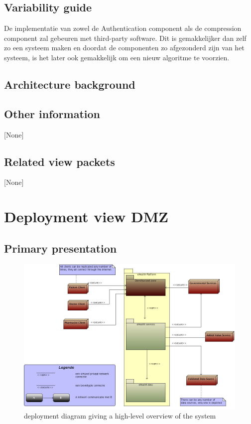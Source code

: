 \documentclass[a4paper,10pt]{article}
\begin{document}
\subsection{Variability guide}
De implementatie van zowel de Authentication component als de compression component zal gebeuren met third-party software. Dit is gemakkelijker dan zelf zo een systeem maken en doordat de componenten zo afgezonderd zijn van het systeem, is het later ook gemakkelijk om een nieuw algoritme te voorzien.\\

\subsection{Architecture background}



\subsection{Other information}
[None]

\subsection{Related view packets}
[None]

\clearpage
\section{Deployment view DMZ}
\label{sec:deploymentView:DMZ}

\subsection{Primary presentation}
 \begin{center}
    \begin{figure}[!h]
      \includegraphics[width=\textwidth]{../images/deployment_DMZ.jpg}
	\caption{deployment diagram giving a high-level overview of the system}
    \end{figure}
 \end{center}
\end{document}
